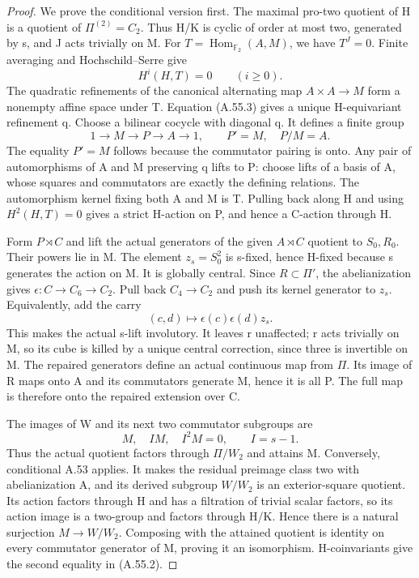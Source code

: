 \begin{proof}
We prove the conditional version first. The maximal pro-two quotient
of H is a quotient of \(\Pi^{(2)}=C_2\). Thus H/K is cyclic of
order at most two, generated by s, and J acts trivially on M.
For \(T=\operatorname{Hom}_{\mathbb F_2}(A,M)\), we have
\(T^J=0\). Finite averaging and Hochschild--Serre give
\[
 H^i(H,T)=0\qquad(i\geq0). \tag{A.55.3}
\]
The quadratic refinements of the canonical alternating map
\(A\times A\to M\) form a nonempty affine space under T.
Equation (A.55.3) gives a unique H-equivariant refinement q.
Choose a bilinear cocycle with diagonal q. It defines a finite group
\[
 1\longrightarrow M\longrightarrow P\longrightarrow A
 \longrightarrow1,\qquad P'=M,\quad P/M=A. \tag{A.55.4}
\]
The equality \(P'=M\) follows because the commutator pairing is onto.
Any pair of automorphisms of A and M preserving q lifts to P:
choose lifts of a basis of A, whose squares and commutators are exactly
the defining relations. The automorphism kernel fixing both A and M
is T. Pulling back along H and using \(H^2(H,T)=0\) gives a strict
H-action on P, and hence a C-action through H.

Form \(P\rtimes C\) and lift the actual generators of the given
\(A\rtimes C\) quotient to \(S_0,R_0\). Their powers lie in M.
The element \(z_s=S_0^2\) is s-fixed, hence H-fixed because s
generates the action on M. It is globally central. Since
\(R\subset\Pi'\), the abelianization gives
\(\epsilon:C\to C_6\to C_2\). Pull back \(C_4\to C_2\)
and push its kernel generator to \(z_s\). Equivalently, add the carry
\[
 (c,d)\longmapsto\epsilon(c)\epsilon(d)z_s. \tag{A.55.5}
\]
This makes the actual s-lift involutory. It leaves r unaffected;
r acts trivially on M, so its cube is killed by a unique central
correction, since three is invertible on M. The repaired generators
define an actual continuous map from \(\Pi\). Its image of R maps
onto A and its commutators generate M, hence it is all P. The full
map is therefore onto the repaired extension over C.

The images of W and its next two commutator subgroups are
\[
 M,\quad IM,\quad I^2M=0,\qquad I=s-1. \tag{A.55.6}
\]
Thus the actual quotient factors through \(\Pi/W_2\) and attains M.
Conversely, conditional A.53 applies. It makes the residual preimage
class two with abelianization A, and its derived subgroup \(W/W_2\)
is an exterior-square quotient. Its action factors through H and has
a filtration of trivial scalar factors, so its action image is a
two-group and factors through H/K. Hence there is a natural
surjection \(M\to W/W_2\). Composing with the attained quotient
is identity on every commutator generator of M, proving it an
isomorphism. H-coinvariants give the second equality in (A.55.2).


\end{proof}
